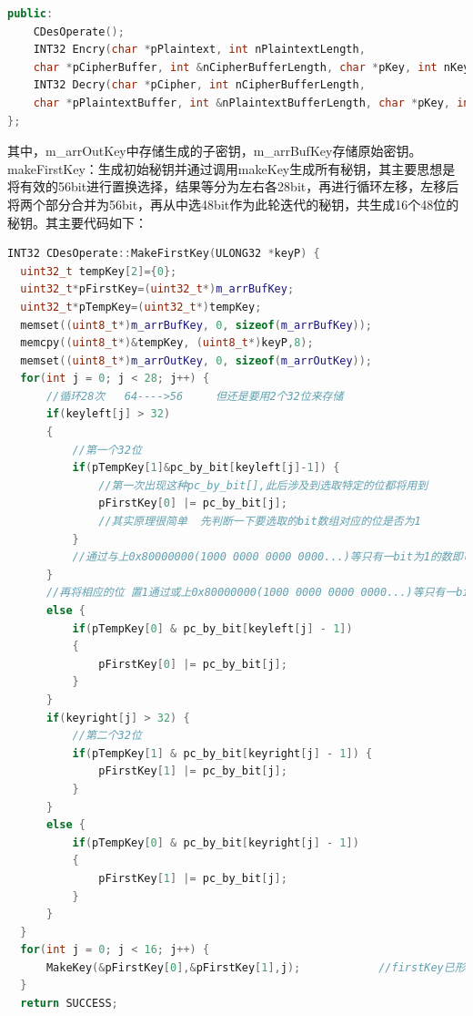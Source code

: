 \documentclass[UTF8,a4paper,10pt]{ctexart}
\begin{document}
\begin{itemize}
\begin{lstlisting}[language = c++]
public:
    CDesOperate();
    INT32 Encry(char *pPlaintext, int nPlaintextLength, 
    char *pCipherBuffer, int &nCipherBufferLength, char *pKey, int nKeyLength);
    INT32 Decry(char *pCipher, int nCipherBufferLength,
    char *pPlaintextBuffer, int &nPlaintextBufferLength, char *pKey, int nKeyLength);
};
  \end{lstlisting}
  其中，m\_arrOutKey中存储生成的子密钥，m\_arrBufKey存储原始密钥。\\
  makeFirstKey：生成初始秘钥并通过调用makeKey生成所有秘钥，其主要思想是将有效的56bit进行置换选择，结果等分为左右各28bit，再进行循环左移，左移后将两个部分合并为56bit，再从中选48bit作为此轮迭代的秘钥，共生成16个48位的秘钥。其主要代码如下：
  \begin{lstlisting}[language = c++]
INT32 CDesOperate::MakeFirstKey(ULONG32 *keyP) {
  uint32_t tempKey[2]={0};
  uint32_t*pFirstKey=(uint32_t*)m_arrBufKey;
  uint32_t*pTempKey=(uint32_t*)tempKey;
  memset((uint8_t*)m_arrBufKey, 0, sizeof(m_arrBufKey));
  memcpy((uint8_t*)&tempKey, (uint8_t*)keyP,8);
  memset((uint8_t*)m_arrOutKey, 0, sizeof(m_arrOutKey));
  for(int j = 0; j < 28; j++) {                                                        
      //循环28次   64---->56     但还是要用2个32位来存储
      if(keyleft[j] > 32)
      {                                                    
          //第一个32位
          if(pTempKey[1]&pc_by_bit[keyleft[j]-1]) {                                                
              //第一次出现这种pc_by_bit[],此后涉及到选取特定的位都将用到
              pFirstKey[0] |= pc_by_bit[j];                                            
              //其实原理很简单  先判断一下要选取的bit数组对应的位是否为1
          }
          //通过与上0x80000000(1000 0000 0000 0000...)等只有一bit为1的数即可判断
      }                                                   
      //再将相应的位 置1通过或上0x80000000(1000 0000 0000 0000...)等只有一bit为1的数即可
      else {
          if(pTempKey[0] & pc_by_bit[keyleft[j] - 1])
          {
              pFirstKey[0] |= pc_by_bit[j];
          }
      }
      if(keyright[j] > 32) {                                                    
          //第二个32位
          if(pTempKey[1] & pc_by_bit[keyright[j] - 1]) {
              pFirstKey[1] |= pc_by_bit[j];
          }
      }
      else {
          if(pTempKey[0] & pc_by_bit[keyright[j] - 1])
          {
              pFirstKey[1] |= pc_by_bit[j];
          }
      }
  }
  for(int j = 0; j < 16; j++) {
      MakeKey(&pFirstKey[0],&pFirstKey[1],j);            //firstKey已形成，循环调用oneStepOfMakeSubKe()形成子秘钥
  }
  return SUCCESS;
  

\end{lstlisting}
\end{itemize}
\end{document}
